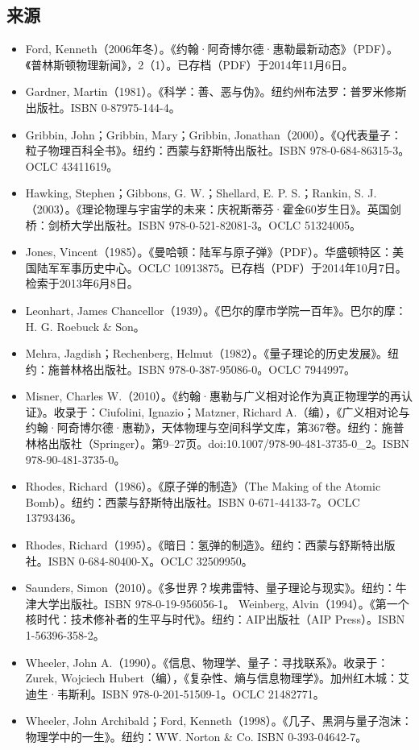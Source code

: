 \subsection{来源}
\begin{itemize}
\item Ford, Kenneth（2006年冬）。《约翰·阿奇博尔德·惠勒最新动态》（PDF）。《普林斯顿物理新闻》，2（1）。已存档（PDF）于2014年11月6日。
\item Gardner, Martin（1981）。《科学：善、恶与伪》。纽约州布法罗：普罗米修斯出版社。ISBN 0-87975-144-4。
\item Gribbin, John；Gribbin, Mary；Gribbin, Jonathan（2000）。《Q代表量子：粒子物理百科全书》。纽约：西蒙与舒斯特出版社。ISBN 978-0-684-86315-3。OCLC 43411619。
\item Hawking, Stephen；Gibbons, G. W.；Shellard, E. P. S.；Rankin, S. J.（2003）。《理论物理与宇宙学的未来：庆祝斯蒂芬·霍金60岁生日》。英国剑桥：剑桥大学出版社。ISBN 978-0-521-82081-3。OCLC 51324005。
\item Jones, Vincent（1985）。《曼哈顿：陆军与原子弹》（PDF）。华盛顿特区：美国陆军军事历史中心。OCLC 10913875。已存档（PDF）于2014年10月7日。检索于2013年6月8日。
\item Leonhart, James Chancellor（1939）。《巴尔的摩市学院一百年》。巴尔的摩：H. G. Roebuck & Son。
\item Mehra, Jagdish；Rechenberg, Helmut（1982）。《量子理论的历史发展》。纽约：施普林格出版社。ISBN 978-0-387-95086-0。OCLC 7944997。
\item Misner, Charles W.（2010）。《约翰·惠勒与广义相对论作为真正物理学的再认证》。收录于：Ciufolini, Ignazio；Matzner, Richard A.（编），《广义相对论与约翰·阿奇博尔德·惠勒》，天体物理与空间科学文库，第367卷。纽约：施普林格出版社（Springer）。第9–27页。doi:10.1007/978-90-481-3735-0\_2。ISBN 978-90-481-3735-0。
\item Rhodes, Richard（1986）。《原子弹的制造》（The Making of the Atomic Bomb）。纽约：西蒙与舒斯特出版社。ISBN 0-671-44133-7。OCLC 13793436。
\item Rhodes, Richard（1995）。《暗日：氢弹的制造》。纽约：西蒙与舒斯特出版社。ISBN 0-684-80400-X。OCLC 32509950。
\item Saunders, Simon（2010）。《多世界？埃弗雷特、量子理论与现实》。纽约：牛津大学出版社。ISBN 978-0-19-956056-1。
Weinberg, Alvin（1994）。《第一个核时代：技术修补者的生平与时代》。纽约：AIP出版社（AIP Press）。ISBN 1-56396-358-2。
\item Wheeler, John A.（1990）。《信息、物理学、量子：寻找联系》。收录于：Zurek, Wojciech Hubert（编），《复杂性、熵与信息物理学》。加州红木城：艾迪生·韦斯利。ISBN 978-0-201-51509-1。OCLC 21482771。
\item Wheeler, John Archibald；Ford, Kenneth（1998）。《几子、黑洞与量子泡沫：物理学中的一生》。纽约：W\.W. Norton & Co. ISBN 0-393-04642-7。
\end{itemize}
